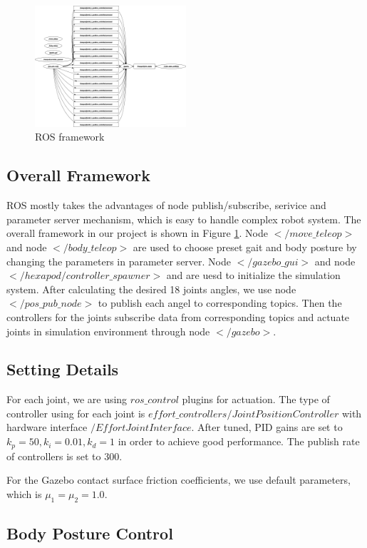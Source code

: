 \documentclass[conference]{IEEEtran}
\begin{document}
\begin{figure}
    \centerline{\includegraphics[width=0.5\textwidth]{rosgraph.png}}
    \caption{ROS framework}
    \label{fig11}
\end{figure}

\subsection{Overall Framework}
ROS mostly takes the advantages of node publish/subscribe, serivice and parameter server mechanism, which is easy to handle complex robot system. The overall framework in our project is shown in Figure \ref{fig11}. Node \(</move\_teleop>\) and node \(</body\_teleop>\) are used to choose preset gait and body posture by changing the parameters in parameter server. Node \(</gazebo\_gui>\) and node \(</hexapod/controller\_spawner>\) and are uesd to initialize the simulation system. After calculating the desired 18 joints angles, we use node \(</pos\_pub\_node>\) to publish each angel to corresponding topics. Then the controllers for the joints subscribe data from corresponding topics and actuate joints in simulation environment through node \(</gazebo>\).
\subsection{Setting Details}

For each joint, we are using \(ros\_control\) plugins for actuation. The type of controller using for each joint is \(effort\_controllers/JointPositionController\) with hardware interface \(/EffortJointInterface\). After tuned, PID gains are set to \(k_p = 50, k_i = 0.01, k_d=1\) in order to achieve good performance. The publish rate of controllers is set to \(300\).  

For the Gazebo contact surface friction coefficients, we use default parameters, which is \(\mu_1 = \mu _2 = 1.0\).

\subsection{Body Posture Control}
\end{document}
